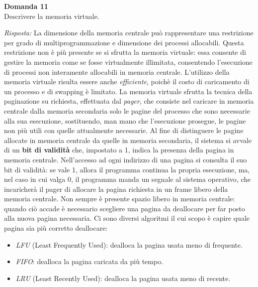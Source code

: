 \documentclass{article}
\newenvironment{problem}[2][Domanda]
    { \begin{mdframed}[backgroundcolor=gray!20] \textbf{#1 #2} \\}
    {  \end{mdframed}}
\newenvironment{solution}
    {\textit{Risposta:}}
    {}
\begin{document}
\begin{problem}{11}
Descrivere la memoria virtuale.
\end{problem}
\begin{solution}
La dimensione della memoria centrale può rappresentare una restrizione per grado di multiprogrammazione e dimensione dei processi allocabili.
Questa restrizione non è più presente se si sfrutta la memoria virtuale: essa consente di gestire la memoria come se fosse virtualmente illimitata, consentendo l’esecuzione di processi non interamente allocabili in memoria centrale.
L’utilizzo della memoria virtuale risulta essere anche \textit{efficiente}, poichè il costo di caricamento di un processo e di swapping è limitato.
\newline
\newline
La memoria virtuale sfrutta la tecnica della paginazione su richiesta, effettuata dal \textit{pager}, che consiste nel caricare in memoria centrale dalla memoria secondaria solo le pagine del processo che sono necessarie alla sua esecuzione, sostituendo, man mano che l’esecuzione prosegue, le pagine non più utili con quelle attualmente necessarie.
\newline
Al fine di distinguere le pagine allocate in memoria centrale da quelle in memoria secondaria, il sistema si avvale di un \textbf{bit di validità} che, impostato a 1, indica la presenza della pagina in memoria centrale.
\newline
Nell’accesso ad ogni indirizzo di una pagina si consulta il suo bit di validità: se vale 1, allora il programma continua la propria esecuzione, ma, nel caso in cui valga 0, il programma manda un segnale al sistema operativo, che incaricherà il pager di allocare la pagina richiesta in un frame libero della memoria centrale.
\newline
Non sempre è presente spazio libero in memoria centrale: quando ciò accade è necessario scegliere una pagina da deallocare per far posto alla nuova pagina necessaria. 
\newline
Ci sono diversi algoritmi il cui scopo è capire quale pagina sia più corretto deallocare:
\begin{itemize}
    \item \emph{LFU} (Least Frequently Used): dealloca la pagina usata meno di frequente.
    \item \emph{FIFO}: dealloca la pagina caricata da più tempo.
    \item \emph{LRU} (Least Recently Used): dealloca la pagina usata meno di recente.
\end{itemize}
\end{solution}
\end{document}
